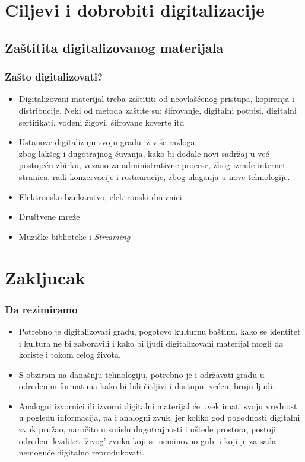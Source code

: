 \documentclass{beamer}
\begin{document}
\section{Ciljevi i dobrobiti digitalizacije}
\subsection{Zaštitita digitalizovanog materijala}
\begin{frame}[fragile]\frametitle{Zašto digitalizovati?}
	\begin{itemize}	
		\item Digitalizovani materijal treba zaštititi od neovlašćenog pristupa, kopiranja i distribucije. Neki od metoda zaštite su: 
		šifrovanje, digitalni potpisi, digitalni sertifikati, vodeni žigovi, šifrovane koverte itd 
		\item Ustanove digitalizuju svoju gradu iz više razloga:\\
		zbog lakšeg i dugotrajnog čuvanja, kako bi dodale novi sadržaj u već postojeću zbirku, vezano za administrativne procese, zbog izrade internet stranica, radi konzervacije i restauracije, zbog ulaganja u nove tehnologije.
		\item Elektronsko bankarstvo, elektronski dnevnici
		\item Društvene mreže
		\item Muzičke biblioteke i \textit{Streaming}
	\end{itemize}
\end{frame}

\section{Zakljucak}

\begin{frame}[fragile]\frametitle{Da rezimiramo}
	\begin{itemize}	
		\item Potrebno je digitalizovati gradu, pogotovo kulturnu baštinu, kako se identitet i kultura ne bi zaboravili i kako bi ljudi  
		digitalizovani materijal mogli da koriste i tokom celog života.
		\item S obzirom na današnju tehnologiju, potrebno je i održavati gradu u odredenim formatima kako bi bili čitljivi i dostupni većem broju ljudi.
		\item Analogni izvornici ili izvorni digitalni materijal će uvek imati svoju vrednost u pogledu informacija, pa i analogni zvuk, 
		jer koliko god pogodnosti digitalni zvuk pružao, naročito u smislu dugotrajnosti i uštede prostora, 
		postoji odredeni kvalitet 'živog' zvuka koji se neminovno gubi i koji je za sada nemoguće digitalno reprodukovati.
	\end{itemize}
	
\end{frame}
\end{document}
